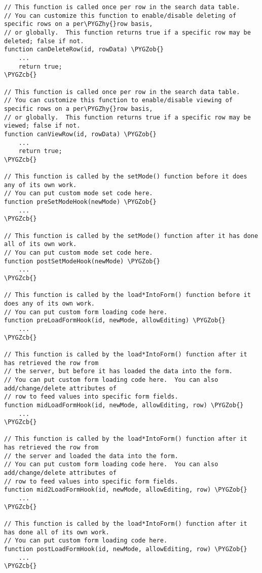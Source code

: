 \documentclass[letterpaper,10pt,english]{sphinxmanual}
\def\PYGZob{\char`\{}
\def\PYGZcb{\char`\}}
\def\PYGZhy{\char`\-}
\begin{document}
\begin{Verbatim}[commandchars=\\\{\}]
// This function is called once per row in the search data table.
// You can customize this function to enable/disable deleting of specific rows on a per\PYGZhy{}row basis,
// or globally.  This function returns true if a specific row may be deleted; false if not.
function canDeleteRow(id, rowData) \PYGZob{}
    ...
    return true;
\PYGZcb{}

// This function is called once per row in the search data table.
// You can customize this function to enable/disable viewing of specific rows on a per\PYGZhy{}row basis,
// or globally.  This function returns true if a specific row may be viewed; false if not.
function canViewRow(id, rowData) \PYGZob{}
    ...
    return true;
\PYGZcb{}

// This function is called by the setMode() function before it does any of its own work.
// You can put custom mode set code here.
function preSetModeHook(newMode) \PYGZob{}
    ...
\PYGZcb{}

// This function is called by the setMode() function after it has done all of its own work.
// You can put custom mode set code here.
function postSetModeHook(newMode) \PYGZob{}
    ...
\PYGZcb{}

// This function is called by the load*IntoForm() function before it does any of its own work.
// You can put custom form loading code here.
function preLoadFormHook(id, newMode, allowEditing) \PYGZob{}
    ...
\PYGZcb{}

// This function is called by the load*IntoForm() function after it has retrieved the row from
// the server, but before it has loaded the data into the form.
// You can put custom form loading code here.  You can also add/change/delete attributes of
// row to feed values into specific form fields.
function midLoadFormHook(id, newMode, allowEditing, row) \PYGZob{}
    ...
\PYGZcb{}

// This function is called by the load*IntoForm() function after it has retrieved the row from
// the server and loaded the data into the form.
// You can put custom form loading code here.  You can also add/change/delete attributes of
// row to feed values into specific form fields.
function mid2LoadFormHook(id, newMode, allowEditing, row) \PYGZob{}
    ...
\PYGZcb{}

// This function is called by the load*IntoForm() function after it has done all of its own work.
// You can put custom form loading code here.
function postLoadFormHook(id, newMode, allowEditing, row) \PYGZob{}
    ...
\PYGZcb{}


\end{Verbatim}
\end{document}
